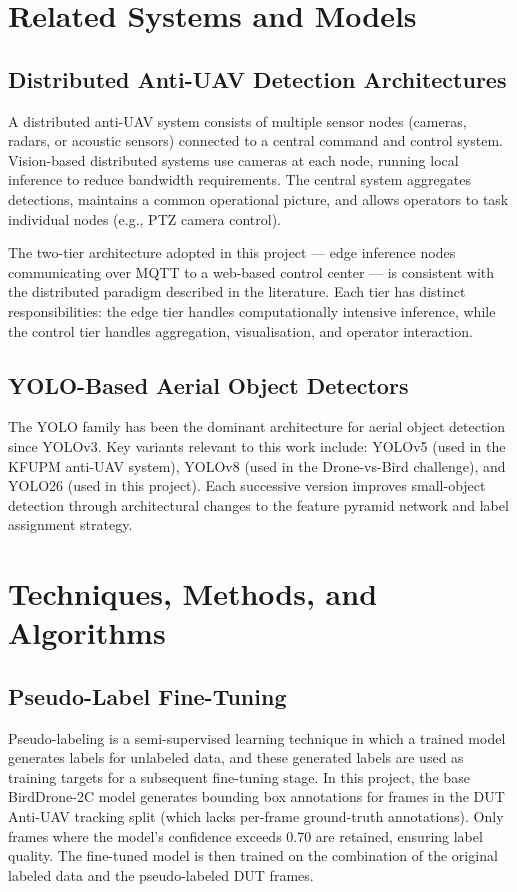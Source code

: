 \documentclass[12pt,a4paper]{report}
\begin{document}
\section{Related Systems and Models}

\subsection{Distributed Anti-UAV Detection Architectures}

A distributed anti-UAV system consists of multiple sensor nodes (cameras,
radars, or acoustic sensors) connected to a central command and control
system. Vision-based distributed systems use cameras at each node, running
local inference to reduce bandwidth requirements. The central system
aggregates detections, maintains a common operational picture, and allows
operators to task individual nodes (e.g., PTZ camera control).

The two-tier architecture adopted in this project --- edge inference nodes
communicating over MQTT to a web-based control center --- is consistent
with the distributed paradigm described in the literature. Each tier has
distinct responsibilities: the edge tier handles computationally intensive
inference, while the control tier handles aggregation, visualisation, and
operator interaction.

\subsection{YOLO-Based Aerial Object Detectors}

The YOLO family has been the dominant architecture for aerial object
detection since YOLOv3. Key variants relevant to this work include:
YOLOv5 (used in the KFUPM anti-UAV system), YOLOv8 (used in the
Drone-vs-Bird challenge), and YOLO26 (used in this project). Each
successive version improves small-object detection through architectural
changes to the feature pyramid network and label assignment strategy.

\section{Techniques, Methods, and Algorithms}

\subsection{Pseudo-Label Fine-Tuning}

Pseudo-labeling is a semi-supervised learning technique in which a trained
model generates labels for unlabeled data, and these generated labels are
used as training targets for a subsequent fine-tuning stage. In this project,
the base BirdDrone-2C model generates bounding box annotations for frames
in the DUT Anti-UAV tracking split (which lacks per-frame ground-truth
annotations). Only frames where the model's confidence exceeds 0.70 are
retained, ensuring label quality. The fine-tuned model is then trained on
the combination of the original labeled data and the pseudo-labeled DUT frames.
\end{document}
